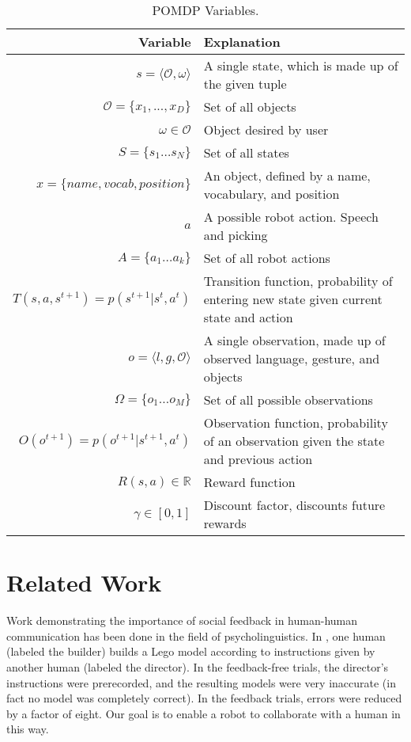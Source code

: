 \documentclass[letterpaper]{article}
\begin{document}
\begin{table*}
\begin{center}
\begin{tabular}{rl}
\toprule
 Variable & Explanation\\
\midrule
 $s = \langle \mathcal{O},\omega\rangle$ & A single state, which is made up of the given tuple \\
 $\mathcal{O} = \{x_1,...,x_D\}$ &  Set of all objects \\
 $\omega \in \mathcal{O}$ & Object desired by user \\
 $S = \{s_1 \dots s_N\}$ & Set of all states \\
 $x = \{name, vocab, position\}$ & An object, defined by a name, vocabulary, and position \\
 $a$ & A possible robot action. Speech and picking \\
 $A = \{a_1 \dots a_k\}$& Set of all robot actions \\
 $T(s, a, s^{t+1})=p(s^{t+1}|s^t,a^t)$& Transition function, probability of entering new state given current state and action \\
 $o = \langle l, g, \mathcal{O} \rangle$ & A single observation, made up of observed language, gesture, and objects \\
 $\Omega = \{o_1 \dots o_M\}$& Set of all possible observations \\
 $O(o^{t+1})=p(o^{t+1}|s^{t+1},a^t)$& Observation function, probability of an observation given the state and previous action \\
 $R(s,a) \in \mathbb{R}$& Reward function \\
 $\gamma \in [0,1]$ & Discount factor, discounts future rewards \\
\bottomrule
\end{tabular}
\caption{\label{table:variables}POMDP Variables.}
\end{center}
\end{table*}


\section{Related Work}
Work demonstrating the importance of social feedback in human-human
communication has been done in the field of psycholinguistics. In  \cite{clark04}, one human (labeled the builder)
builds a Lego model according to instructions given by another human
(labeled the director). In the feedback-free trials, the director's
instructions were prerecorded, and the resulting models were very
inaccurate (in fact no model was completely correct). In the feedback
trials, errors were reduced by a factor of eight. Our goal is to
enable a robot to collaborate with a human in this way.
\end{document}
